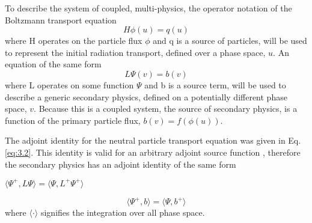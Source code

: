 To describe the system of coupled, multi-physics,
the operator notation of the Boltzmann transport equation
\begin{equation}
	H\phi(u) = q(u)
\end{equation}
where H operates on the particle flux $\phi$ and q is a source of particles, 
will be used to represent the initial radiation transport, defined over a
phase space, $u$.
An equation of the same form 
\begin{equation}
	L\Psi(v) = b(v)
\end{equation}
where L operates
on some function $\Psi$ and b is a source term, will be used
to describe a generic secondary physics, defined on a potentially
different phase space, $v$.
Because this is a coupled system, the source of secondary physics, is a function
of the primary particle flux, $b(v) = f(\phi(u))$.

The adjoint identity for the neutral particle transport
equation was given in Eq. \ref{eq:3.2}.
This identity is valid for an arbitrary
adjoint source function
\cite{l_m}, therefore the secondary physics has an adjoint identity of the same
form
\begin{center}
{$\langle \Psi^{+}, L\Psi \rangle = \langle \Psi, L^{+}\Psi^{+} \rangle $}
\end{center}
\begin{equation}\label{eq:adj_2_identity}
	\langle \Psi^{+}, b \rangle =
	\langle \Psi, b^{+} \rangle 
\end{equation}
where $\langle \cdot \rangle$ signifies the integration over all phase space.

